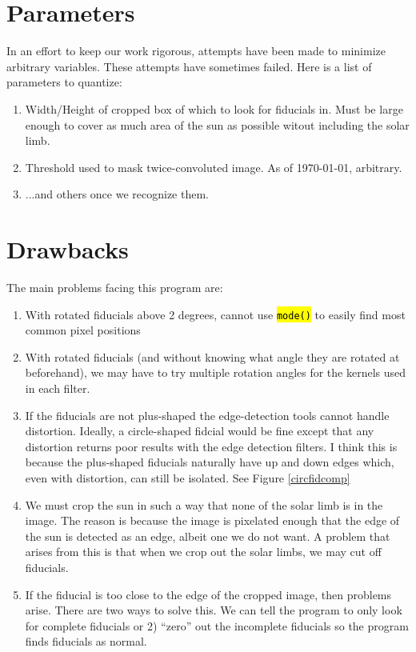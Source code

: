\documentclass[10pt]{article}
\begin{document}
\section{Parameters}
    In an effort to keep our work rigorous, attempts have been made to minimize arbitrary variables. These attempts have sometimes failed. Here is a list of parameters to quantize:
    \begin{enumerate}
        \item Width/Height of cropped box of which to look for fiducials in. Must be large enough to cover as much area of the sun as possible witout including the solar limb.
        \item Threshold used to mask twice-convoluted image. As of \today, arbitrary.
        \item ...and others once we recognize them.
    \end{enumerate}

\section{Drawbacks}

    The main problems facing this program are:

    \begin{enumerate}
        \item With rotated fiducials above 2 degrees, cannot use \hl{\texttt{mode()}} to easily find most common pixel positions
        \item With rotated fiducials (and without knowing what angle they are rotated at beforehand), we may have to try multiple rotation angles for the kernels used in each filter.
        \item If the fiducials are not plus-shaped the edge-detection tools cannot handle distortion. Ideally, a circle-shaped fidcial would be fine except that any distortion returns poor results with the edge detection filters. I think this is because the plus-shaped fiducials naturally have up and down edges which, even with distortion, can still be isolated. See Figure \ref{circfidcomp}
        \item We must crop the sun in such a way that none of the solar limb is in the image. The reason is because the image is pixelated enough that the edge of the sun is detected as an edge, albeit one we do not want. A problem that arises from this is that when we crop out the solar limbs, we may cut off fiducials.
        \item If the fiducial is too close to the edge of the cropped image, then problems arise. There are two ways to solve this. We can tell the program to only look for complete fiducials or 2) ``zero'' out the incomplete fiducials so the program finds fiducials as normal.
    \end{enumerate}
\end{document}
